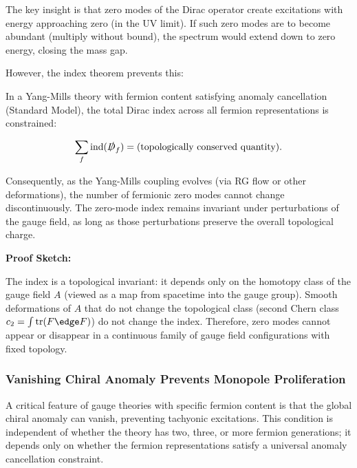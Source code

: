 The key insight is that zero modes of the Dirac operator create excitations with energy approaching zero (in the UV limit). If such zero modes are to become abundant (multiply without bound), the spectrum would extend down to zero energy, closing the mass gap.

However, the index theorem prevents this:

\begin{lemma}
\label{lem:indexObstructionGap}

In a Yang-Mills theory with fermion content satisfying anomaly cancellation (Standard Model), the total Dirac index across all fermion representations is constrained:

\begin{equation}
\sum_{f} \text{ind}(\slashed{D}_f) = \text{(topologically conserved quantity)}.
\end{equation}

Consequently, as the Yang-Mills coupling evolves (via RG flow or other deformations), the number of fermionic zero modes cannot change discontinuously. The zero-mode index remains invariant under perturbations of the gauge field, as long as those perturbations preserve the overall topological charge.

\end{lemma}

\noindent\textbf{Proof Sketch:} 

The index is a topological invariant: it depends only on the homotopy class of the gauge field $A$ (viewed as a map from spacetime into the gauge group). Smooth deformations of $A$ that do not change the topological class (second Chern class $c_2 = \int \mathrm{tr}(F \edge F)$) do not change the index. Therefore, zero modes cannot appear or disappear in a continuous family of gauge field configurations with fixed topology.

\subsubsection{Vanishing Chiral Anomaly Prevents Monopole Proliferation}

A critical feature of gauge theories with specific fermion content is that the global chiral anomaly can vanish, preventing tachyonic excitations. This condition is independent of whether the theory has two, three, or more fermion generations; it depends only on whether the fermion representations satisfy a universal anomaly cancellation constraint.

